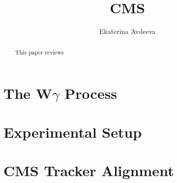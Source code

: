 \documentclass{article}
\begin{document}
 
\pagenumbering{}
\title{\textbf{CMS}}

\author{Ekaterina Avdeeva}

\maketitle

\begin{abstract}
This paper reviews
\end{abstract}




\pagestyle{fancy}
\fancyhf{}
\lhead[]{\thepage}
\rhead[\thepage]{}

\tableofcontents

%









\section{The W$\gamma$ Process} %




\section{Experimental Setup} %



\section{CMS Tracker Alignment} %













\end{document}
